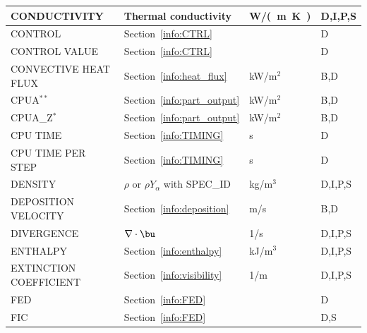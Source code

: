 \documentclass[11pt]{book}
\begin{document}
\begin{longtable}{@{\extracolsep{\fill}}|l|l|l|l|}
{\ct CONDUCTIVITY}                              & Thermal conductivity                          & \si{W/(m.K)}   & D,I,P,S      \\ \hline
{\ct CONTROL}                                   & Section~\ref{info:CTRL}                       &                & D            \\ \hline
{\ct CONTROL VALUE}                             & Section~\ref{info:CTRL}                       &                & D            \\ \hline
{\ct CONVECTIVE HEAT FLUX}                      & Section~\ref{info:heat_flux}                  & kW/m$^2$       & B,D          \\ \hline
{\ct CPUA}$^{**}$                               & Section~\ref{info:part_output}                & kW/m$^2$       & B,D          \\ \hline
{\ct CPUA\_Z}$^{*}$                             & Section~\ref{info:part_output}                & kW/m$^2$       & B,D          \\ \hline
{\ct CPU TIME}                                  & Section~\ref{info:TIMING}                     & s              & D            \\ \hline
{\ct CPU TIME PER STEP}                         & Section~\ref{info:TIMING}                     & s              & D            \\ \hline
{\ct DENSITY}                                   & $\rho$ or $\rho Y_\alpha$ with {\ct SPEC\_ID} & kg/m$^3$       & D,I,P,S      \\ \hline
{\ct DEPOSITION VELOCITY}                       & Section~\ref{info:deposition}                 & m/s            & B,D          \\ \hline
{\ct DIVERGENCE}                                & $\nabla \cdot \bu$                            & 1/s            & D,I,P,S      \\ \hline
{\ct ENTHALPY}                                  & Section~\ref{info:enthalpy}                   & kJ/m$^3$       & D,I,P,S      \\ \hline
{\ct EXTINCTION COEFFICIENT}                    & Section~\ref{info:visibility}                 & 1/m            & D,I,P,S      \\ \hline
{\ct FED}                                       & Section~\ref{info:FED}                        &                & D            \\ \hline
{\ct FIC}                                       & Section~\ref{info:FED}                        &                & D,S          \\ \hline

\end{longtable}
\end{document}

